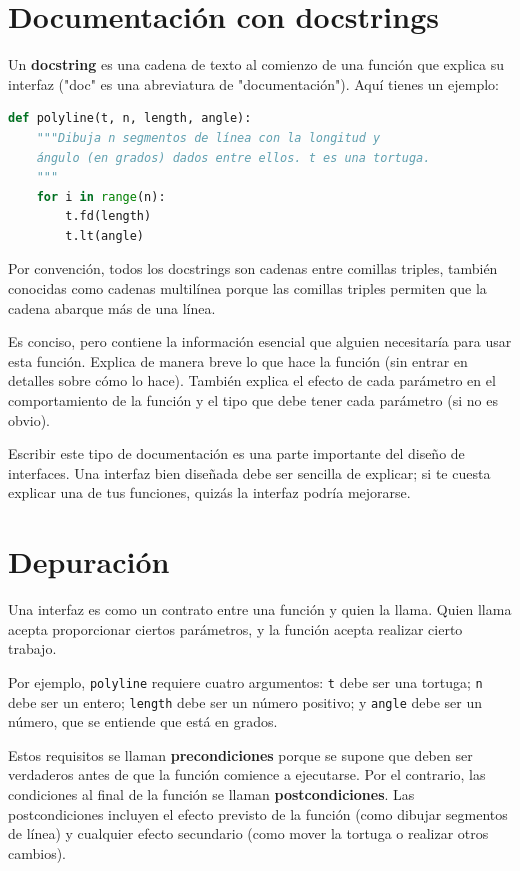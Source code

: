 \section{Documentación con docstrings}

Un \textbf{docstring} es una cadena de texto al comienzo de una función que explica su interfaz ("doc" es una abreviatura de "documentación"). Aquí tienes un ejemplo:

\begin{lstlisting}[language=Python]
def polyline(t, n, length, angle):
    """Dibuja n segmentos de línea con la longitud y
    ángulo (en grados) dados entre ellos. t es una tortuga.
    """
    for i in range(n):
        t.fd(length)
        t.lt(angle)
\end{lstlisting}

Por convención, todos los docstrings son cadenas entre comillas triples, también conocidas como cadenas multilínea porque las comillas triples permiten que la cadena abarque más de una línea.

Es conciso, pero contiene la información esencial que alguien necesitaría para usar esta función. Explica de manera breve lo que hace la función (sin entrar en detalles sobre cómo lo hace). También explica el efecto de cada parámetro en el comportamiento de la función y el tipo que debe tener cada parámetro (si no es obvio).

Escribir este tipo de documentación es una parte importante del diseño de interfaces. Una interfaz bien diseñada debe ser sencilla de explicar; si te cuesta explicar una de tus funciones, quizás la interfaz podría mejorarse.

\section{Depuración}

Una interfaz es como un contrato entre una función y quien la llama. Quien llama acepta proporcionar ciertos parámetros, y la función acepta realizar cierto trabajo.

Por ejemplo, \texttt{polyline} requiere cuatro argumentos: \texttt{t} debe ser una tortuga; \texttt{n} debe ser un entero; \texttt{length} debe ser un número positivo; y \texttt{angle} debe ser un número, que se entiende que está en grados.

Estos requisitos se llaman \textbf{precondiciones} porque se supone que deben ser verdaderos antes de que la función comience a ejecutarse. Por el contrario, las condiciones al final de la función se llaman \textbf{postcondiciones}. Las postcondiciones incluyen el efecto previsto de la función (como dibujar segmentos de línea) y cualquier efecto secundario (como mover la tortuga o realizar otros cambios).

